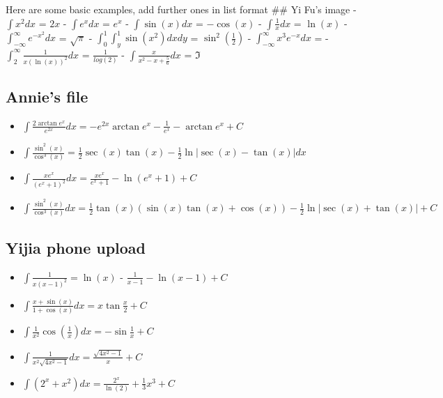 Here are some basic examples, add further ones in list format \#\# Yi
Fu's image - \(\int x^2 dx\) = \(2x\) - \(\int e^x dx\) = \(e^x\) -
\(\int \sin (x) dx\) = \(- \cos (x)\) - \(\int \frac{1}{x} dx\) =
\(\ln (x)\) - \(\int_{-\infty}^\infty e^{-x^2} dx\) = \(\sqrt{\pi}\) -
\(\int_0^1 \int_y^1 \sin (x^2) dx dy\) = \(\sin^2(\frac{1}{2})\) -
\(\int_{-\infty}^{\infty} x^3 e^{-x} dx\) = -
\(\int_2^\infty \frac{1}{x(\ln (x))^2} dx\) = \(\frac{1}{log(2)}\) -
\(\int \frac{x}{x^2-x+\frac{5}{6}}dx\) = \(\Im\)

\hypertarget{annies-file}{%
\subsection{Annie's file}\label{annies-file}}

\begin{itemize}
\tightlist
\item
  \(\displaystyle \int \frac{2 \arctan e^x}{e^{2x}} dx = -e^{2x}\arctan e^x - \displaystyle\frac{1}{e^x}-\arctan e^x + C\)
\item
  \(\displaystyle \int \frac{\sin^2(x)}{\cos^3(x)} = \frac{1}{2}\sec(x)\tan(x) - \frac{1}{2}\ln|\sec(x) - \tan(x)| dx\)
\item
  \(\displaystyle \int \frac{xe^x}{(e^x + 1)^2}dx = \frac{xe^x}{e^x+1} - \ln(e^x + 1) + C\)
\item
  \(\displaystyle \int \frac{\sin^2(x)}{\cos^3(x)}dx = \frac{1}{2} \tan(x)(\sin(x)\tan(x)+ \cos(x)) - \frac{1}{2} \ln|\sec(x) +\tan(x)| + C\)
\end{itemize}

\hypertarget{yijia-phone-upload}{%
\subsection{Yijia phone upload}\label{yijia-phone-upload}}

\begin{itemize}
\tightlist
\item
  \(\displaystyle \int \frac{1}{x(x-1)^2} = \ln(x)\) -
  \(\frac{1}{x-1} - \ln(x-1) + C\)
\item
  \(\displaystyle \int \frac{x + \sin(x)}{1 + \cos(x)}dx = x \tan \frac{x}{2} + C\)
\item
  \(\displaystyle \int \frac{1}{x^2}\cos(\frac{1}{x})dx = - \sin{\frac{1}{x}} + C\)
\item
  \(\displaystyle \int \frac{1}{x^2\sqrt{4x^2 -1}}dx = \frac{\sqrt{4x^2-1}}{x} +C\)
\item
  \(\displaystyle \int (2^x + x^2) dx = \frac{2^x}{\ln(2)} + \frac{1}{3}x^3 + C\)
\end{itemize}

